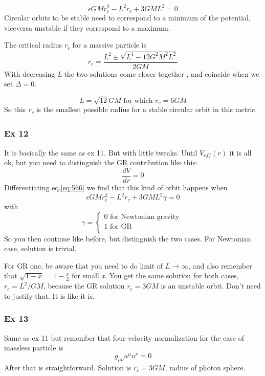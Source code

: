 \[
\epsilon GM r_{c}^{2}- L^{2}r_{c} + 3GML^{2} = 0
\]
Circular orbits to be stable need to correspond to a minimum of the potential, viceversa unstable if they correspond to a maximum.\par
The critical radius \emph{r\textsubscript{c}} for a massive particle is
\begin{equation}
	r_{c} = \frac{L^{2} \pm \sqrt{ L^{4} - 12G^{2} M^{2}L^{2}}}{2GM}
\end{equation}
With decreasing \emph{ L} the two solutions come closer together , and coincide when we set $\Delta =0$.\par
\[
	L = \sqrt{12}GM \text{ for which } r_{c} = 6GM
\]
So this \emph{r\textsubscript{c}} is the smallest possible radius for a stable circular orbit in this metric.

\subsubsection{Ex 12}
It is basically the same as ex 11. But with little tweaks. Until $V_{eff}\left( r \right)$ it is all ok, but you need to distinguish the GR contribution like this:
\[
\frac{d V}{d r} = 0
\]
Differentiating eq.\ref{eq:566} we find that this kind of orbit happens when
\[
\epsilon GM r_{c}^{2}- L^{2}r_{c} + 3GML^{2}\gamma  = 0
\]
with
\[
\gamma = \begin{cases}
0 \text{ for Newtonian gravity } \\
1 \text{ for GR } \\
\end{cases}
\]
So you then continue like before, but distinguish the two cases. For Newtonian case, solution is trivial.\par
 For GR one, be aware that you need to do limit of $L\to \infty$, and also remember that $\sqrt{1-x} = 1 - \frac{x}{2}$ for small \emph{x}. You get the same solution for both cases, $r_{c} = L^{2}/GM$, because the GR solution $r_{c} = 3GM$ is an unstable orbit. Don't need to justify that. It is like it is.

\subsubsection{Ex 13}
Same as ex 11 but remember that four-velocity normalization for the case of massless particle is
\[
g_{\mu \nu }u^{\mu }u^{\nu } = 0
\]
After that is straightforward. Solution is $r_{c} = 3GM$, radius of photon sphere.

